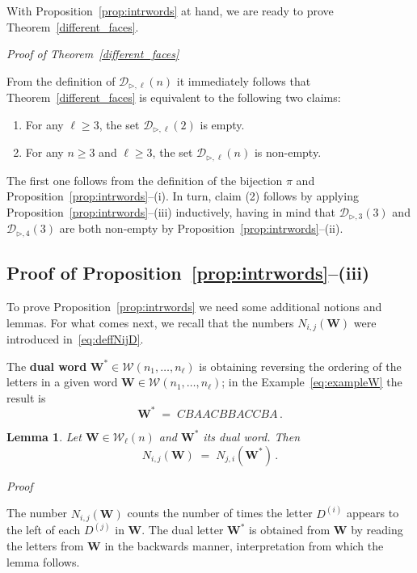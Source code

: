 \documentclass[reqno,a4paper,11pt]{amsart}
\makeatletter
\newcommand{\btt}{\triangleright}
\newtheorem{lemma}{Lemma}
\theoremstyle{remark}
\newcommand{\mc}[1]{{\mathcal #1}}
\newcommand{\mb}[1]{{\mathbf #1}}
\numberwithin{equation}{section}
\renewenvironment{proof}[1][Proof]{\par
\pushQED{\qed}%
\normalfont \topsep6\p@\@plus6\p@\relax
\trivlist
\item\relax
{\itshape
#1\@addpunct{.}}\hspace\labelsep\ignorespaces
}{%
\popQED\endtrivlist\@endpefalse
}
\makeatother
\begin{document}
With Proposition~\ref{prop:intrwords} at hand, we are ready to prove Theorem~\ref{different_faces}.
\begin{proof}[Proof of Theorem~\ref{different_faces}]
From the definition of $\mc D_{\btt, \ell}(n)$ it immediately follows that Theorem~\ref{different_faces} is equivalent to the following two claims:
%
\begin{enumerate}[(1)]
\item For any $\ell\geq 3$, the set $\mc D_{\btt, \ell}(2)$ is empty.
\item For any $n\geq 3$ and $\ell\geq 3$, the set $\mc D_{\btt, \ell}(n)$ is non-empty.
\end{enumerate}

The first one follows from the definition of the bijection $\pi$ and Proposition~\ref{prop:intrwords}--(i). In turn, claim (2) follows by applying Proposition~\ref{prop:intrwords}--(iii) inductively, having in mind that $\mc D_{\btt,3}(3)$ and $\mc D_{\btt, 4}(3)$ are both non-empty by Proposition~\ref{prop:intrwords}--(ii).
\end{proof}

\subsection{Proof of Proposition~\ref{prop:intrwords}--(iii)}\label{sec:proofpropintrwords}\hfill

To prove Proposition~\ref{prop:intrwords} we need some additional notions and lemmas. For what comes next, we recall that the numbers $N_{i,j}(\mb W)$ were introduced in~\eqref{eq:deffNijD}.

The \textbf{dual word} $\mb W^*\in \mc W(n_1,\hdots,n_\ell)$ is obtaining reversing the ordering of the letters in a given word $\mb W\in \mc W(n_1,\hdots,n_\ell)$; in the Example~\eqref{eq:exampleW} the result is
%
$$
\mb W^*\;=\;CBAACBBACCBA\,.
$$

\begin{lemma} \label{Lemma: nac > n*ca}
Let $\mb W\in \mc W_\ell(n)$ and $\mb W^*$ its dual word. Then
%
$$
N_{i,j}(\mb W)\;=\;N_{j,i}(\mb W^*)\,.
$$
\end{lemma}
\begin{proof}
The number $N_{i,j}(\mb W)$ counts the number of times the letter $D^{(i)}$ appears to the left of each $D^{(j)}$ in $\mb W$. The dual letter $\mb W^*$ is obtained from $\mb W$ by reading the letters from $\mb W$ in the backwards manner, interpretation from which the lemma follows.
\end{proof}
\end{document}
